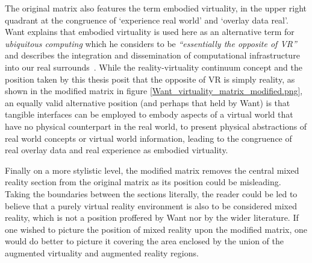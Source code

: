 The original matrix also features the term embodied virtuality, in the upper right quadrant at the congruence of `experience real world' and `overlay data real'. Want explains that embodied virtuality is used here as an alternative term for \textit{ubiquitous computing} which he considers to be \textit{``essentially the opposite of VR''} and describes the integration and dissemination of computational infrastructure into our real surrounds~\cite{York2004}. While the reality-virtuality continuum concept and the position taken by this thesis posit that the opposite of VR is simply reality, as shown in the modified matrix in figure \ref{Want_virtuality_matrix_modified.png}, an equally valid alternative position (and perhaps that held by Want) is that tangible interfaces can be employed to embody aspects of a virtual world that have no physical counterpart in the real world, to present physical abstractions of real world concepts or virtual world information, leading to the congruence of real overlay data and real experience as embodied virtuality.


Finally on a more stylistic level, the modified matrix removes the central mixed reality section from the original matrix as its position could be misleading. Taking the boundaries between the sections literally, the reader could be led to believe that a purely virtual reality environment is also to be considered mixed reality, which is not a position proffered by Want nor by the wider literature. If one wished to picture the position of mixed reality upon the modified matrix, one would do better to picture it covering the area enclosed by the union of the augmented virtuality and augmented reality regions.


